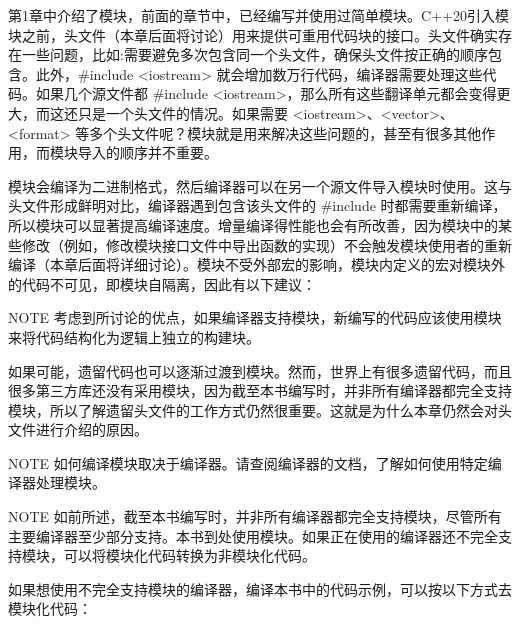 
第1章中介绍了模块，前面的章节中，已经编写并使用过简单模块。C++20引入模块之前，头文件（本章后面将讨论）用来提供可重用代码块的接口。头文件确实存在一些问题，比如:需要避免多次包含同一个头文件，确保头文件按正确的顺序包含。此外，\#include <iostream> 就会增加数万行代码，编译器需要处理这些代码。如果几个源文件都 \#include <iostream>，那么所有这些翻译单元都会变得更大，而这还只是一个头文件的情况。如果需要 <iostream>、<vector>、<format> 等多个头文件呢？模块就是用来解决这些问题的，甚至有很多其他作用，而模块导入的顺序并不重要。

模块会编译为二进制格式，然后编译器可以在另一个源文件导入模块时使用。这与头文件形成鲜明对比，编译器遇到包含该头文件的 \#include 时都需要重新编译，所以模块可以显著提高编译速度。增量编译得性能也会有所改善，因为模块中的某些修改（例如，修改模块接口文件中导出函数的实现）不会触发模块使用者的重新编译（本章后面将详细讨论）。模块不受外部宏的影响，模块内定义的宏对模块外的代码不可见，即模块自隔离，因此有以下建议：

\begin{myNotic}{NOTE}
考虑到所讨论的优点，如果编译器支持模块，新编写的代码应该使用模块来将代码结构化为逻辑上独立的构建块。
\end{myNotic}

如果可能，遗留代码也可以逐渐过渡到模块。然而，世界上有很多遗留代码，而且很多第三方库还没有采用模块，因为截至本书编写时，并非所有编译器都完全支持模块，所以了解遗留头文件的工作方式仍然很重要。这就是为什么本章仍然会对头文件进行介绍的原因。

\begin{myNotic}{NOTE}
如何编译模块取决于编译器。请查阅编译器的文档，了解如何使用特定编译器处理模块。
\end{myNotic}

\begin{myNotic}{NOTE}
如前所述，截至本书编写时，并非所有编译器都完全支持模块，尽管所有主要编译器至少部分支持。本书到处使用模块。如果正在使用的编译器还不完全支持模块，可以将模块化代码转换为非模块化代码。
\end{myNotic}


如果想使用不完全支持模块的编译器，编译本书中的代码示例，可以按以下方式去模块化代码：

